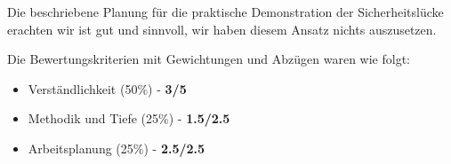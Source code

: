 \documentclass{article}
\begin{document}
 Die beschriebene Planung für die praktische Demonstration der Sicherheitslücke
 erachten wir ist gut und sinnvoll, wir haben diesem Ansatz nichts auszusetzen.

 \pagebreak

 Die Bewertungskriterien mit Gewichtungen und Abzügen waren wie folgt:

 \begin{itemize}
   \item Verständlichkeit (50\%) - \textbf{3/5}
   \item Methodik und Tiefe (25\%) - \textbf{1.5/2.5}
   \item Arbeitsplanung (25\%) - \textbf{2.5/2.5}
 \end{itemize}
\end{document}
